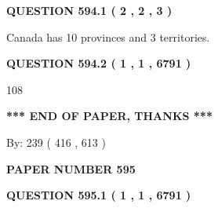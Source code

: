 \documentclass[12pt]{article}
\begin{document}
   
  
\vspace{0.2in}
  
{\textbf{\Large{QUESTION
594.1 
 ( 2 , 2 , 3 )
}}}
  
  
 
 
\noindent{}
 
 
Canada has 10  provinces and 3 territories.
 
 
 
 
  
\vspace{0.2in}
  
{\textbf{\Large{QUESTION
594.2 
 ( 1 , 1 , 6791 )
}}}
  
  
 
 
\noindent{}

108
 
 
   
   
 \vspace{0.2in}
 
   
   
   
   
\vspace{1.0in} 
{\textbf{\large{ *** END OF PAPER, THANKS *** }}} 
   
   
\hspace{1.0in} By: 
 239 ( 416 ,  613 )
   
   
   
   
\newpage 
\setcounter{page}{ 
   595001 } 
   
   
   
   
 {\textbf{ \Large{ PAPER NUMBER  595  }}}
   
   
\vspace{0.2in}
   
   
   
   
   
   
 \vspace{0.2in}
 
 
 
 
   
   
  
\vspace{0.2in}
  
{\textbf{\Large{QUESTION
595.1 
 ( 1 , 1 , 6791 )
}}}
  
\end{document}
